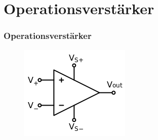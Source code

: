 \section*{Operations\-verstärker}
\begin{frame}
  \frametitle{Operationsverstärker}
  \begin{minipage}{0.4\textwidth}
    \begin{figure}
      \includegraphics[width=\textwidth,height=.4\textheight,keepaspectratio]{e13/OPV.png}
    \end{figure}
  \end{minipage}
  \hspace{0.5cm}
  \begin{minipage}{0.4\textwidth}
    \begin{figure}

\end{figure}
\end{minipage}
\end{frame}
